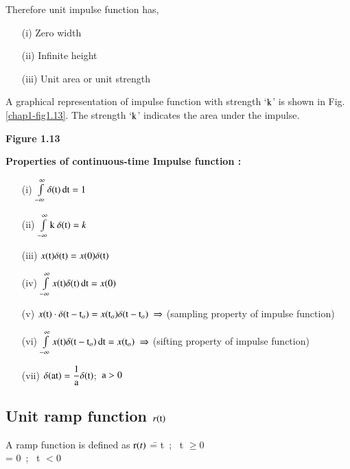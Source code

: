 Therefore unit impulse function has,
\begin{itemize}
\item[(i)] Zero width

\item[(ii)] Infinite height

\item[(iii)] Unit area or unit strength
\end{itemize}

A graphical representation of impulse function with strength `$\textrm{k}$' is shown in Fig. \ref{chap1-fig1.13}. The strength `$\textrm{k}$' indicates the area under the impulse.
\begin{center}
{\bf Figure 1.13}
\end{center}

\medskip
\noindent
{\bf Properties of continuous-time Impulse function :}
\begin{itemize}
\item[(i)] $\int\limits^{\infty}_{-\infty}\delta(\textrm{t})\operatorname{dt}=1$

\item[(ii)] $\int\limits^{\infty}_{-\infty}\textrm{k} \ \delta (\textrm{t})=k$

\item[(iii)] $x(\textrm{t})\delta(\textrm{t})=x(0)\delta(\textrm{t})$

\item[(iv)] $\int\limits^{\infty}_{-\infty}x(\textrm{t})\delta(\textrm{t})\operatorname{dt}=x(0)$

\item[(v)] $x(\rmt)\cdot \delta(\rmt-\rmt_{o})=x(\rmt_{o})\delta(\rmt-\rmt_{o}) \ \Rightarrow$ (sampling property of impulse function)

\item[(vi)] $\int\limits^{\infty}_{-\infty}x(\textrm{t})\delta(\textrm{t}-\textrm{t}_{o})\operatorname{dt}=x(\textrm{t}_{o}) \ \Rightarrow$ (sifting property of impulse function)

\item[(vii)] $\delta(\textrm{at})=\dfrac{1}{\textrm{a}}\delta(\textrm{t})$\quad ;~$\textrm{a}>0$
\end{itemize}

\subsection{Unit ramp function $r(\textrm{t})$}

\begin{tabbing}
A ramp function is defined as $\textrm{r}(t)$ \== t\quad~;~ t $\geq 0$\\
                                        \>= 0\!\quad~;~ t $<0$
\end{tabbing}

